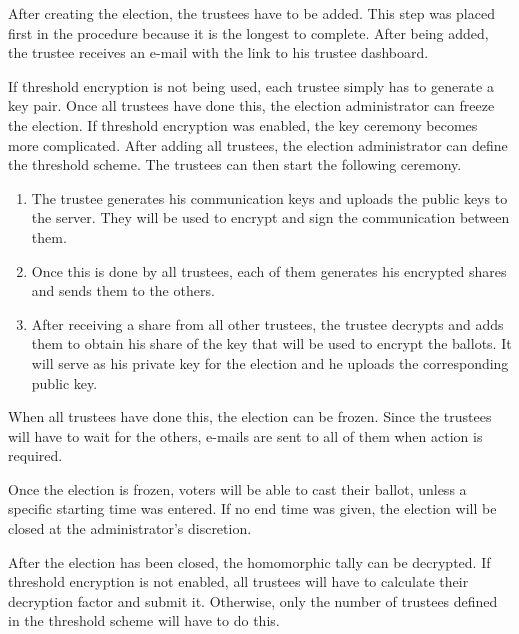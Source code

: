 \par After creating the election, the trustees have to be added. This step was placed first in the procedure because it is the longest to complete. After being added, the trustee receives an e-mail with the link to his trustee dashboard.

\par If threshold encryption is not being used, each trustee simply has to generate a key pair. Once all trustees have done this, the election administrator can freeze the election. If threshold encryption was enabled, the key ceremony becomes more complicated. After adding all trustees, the election administrator can define the threshold scheme. The trustees can then start the following ceremony.

\begin{enumerate}
  \item The trustee generates his communication keys and uploads the public keys to the server. They will be used to encrypt and sign the communication between them.
  \item Once this is done by all trustees, each of them generates his encrypted shares and sends them to the others.
  \item After receiving a share from all other trustees, the trustee decrypts and adds them to obtain his share of the key that will be used to encrypt the ballots. It will serve as his private key for the election and he uploads the corresponding public key.
\end{enumerate}

\par When all trustees have done this, the election can be frozen. Since the trustees will have to wait for the others, e-mails are sent to all of them when action is required.

\par Once the election is frozen, voters will be able to cast their ballot, unless a specific starting time was entered. If no end time was given, the election will be closed at the administrator's discretion.

\par After the election has been closed, the homomorphic tally can be decrypted. If threshold encryption is not enabled, all trustees will have to calculate their decryption factor and submit it. Otherwise, only the number of trustees defined in the threshold scheme will have to do this.